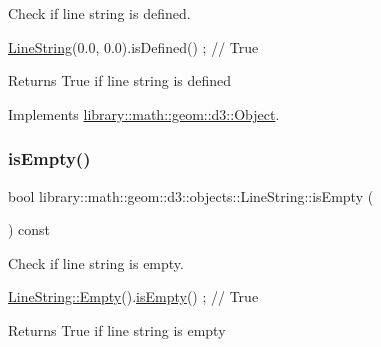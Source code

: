 Check if line string is defined. 


\begin{DoxyCode}
\hyperlink{classlibrary_1_1math_1_1geom_1_1d3_1_1objects_1_1_line_string_aab80e60f34f06d4ab9f84f0e59aa389e}{LineString}(0.0, 0.0).isDefined() ; \textcolor{comment}{// True}
\end{DoxyCode}


\begin{DoxyReturn}{Returns}
True if line string is defined 
\end{DoxyReturn}


Implements \hyperlink{classlibrary_1_1math_1_1geom_1_1d3_1_1_object_a2216442e322f0c3ca5f01a4efa22baf7}{library\+::math\+::geom\+::d3\+::\+Object}.

\mbox{\label{classlibrary_1_1math_1_1geom_1_1d3_1_1objects_1_1_line_string_a33e1e2dfcd7352eb41b6991bd97ec6cd}} 
\subsubsection{\texorpdfstring{is\+Empty()}{isEmpty()}}
{\footnotesize\ttfamily bool library\+::math\+::geom\+::d3\+::objects\+::\+Line\+String\+::is\+Empty (\begin{DoxyParamCaption}{ }\end{DoxyParamCaption}) const}



Check if line string is empty. 


\begin{DoxyCode}
\hyperlink{classlibrary_1_1math_1_1geom_1_1d3_1_1objects_1_1_line_string_ae9e05ddb3ab59060c78d18e19624f307}{LineString::Empty}().\hyperlink{classlibrary_1_1math_1_1geom_1_1d3_1_1objects_1_1_line_string_a33e1e2dfcd7352eb41b6991bd97ec6cd}{isEmpty}() ; \textcolor{comment}{// True}
\end{DoxyCode}


\begin{DoxyReturn}{Returns}
True if line string is empty 
\end{DoxyReturn}
\mbox{\label{classlibrary_1_1math_1_1geom_1_1d3_1_1objects_1_1_line_string_acbfb3f1c542793b9fa810ba8626633c4}} 
